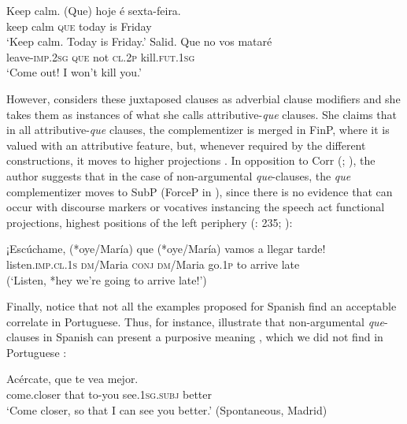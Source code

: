 \documentclass[output=paper,colorlinks,citecolor=brown,
]{langscibook}
\begin{document}
\ea \label{ex:matos:keep-calm}
\settowidth{}
 \ea \label{ex:matos:keep-calm-a}
 \gll Keep calm. (Que) hoje é sexta-feira. \\
	  keep calm \textsc{que} today is Friday\\
 \glt ‘Keep calm. Today is Friday.’
 \ex \label{ex:matos:salid}
 \gll Salid. Que no vos mataré \\
	  leave-\textsc{imp}.\textsc{2sg} \textsc{que} not \textsc{cl}.\textsc{2p} kill.\textsc{fut}.\textsc{1sg}\\
 \glt ‘Come out! I won’t kill you.’
 \z
 \citep[148]{kocher_unselected_2019}
\z 

However, \citet{kocher_unselected_2019} considers these juxtaposed clauses as adverbial clause modifiers and she takes them as instances of what she calls attributive-\textit{que} clauses. She claims that in all attributive-\textit{que} clauses, the complementizer is merged in FinP, where it is valued with an attributive feature, but, whenever required by the different constructions, it moves to higher projections \citep[161]{kocher_unselected_2019}. In opposition to Corr (\citeyear{corr_ibero-romance_2016}; \citeyear{corr_matrix_2018}), the author suggests that in the case of non-argumental \textit{que}-clauses, the \textit{que} complementizer moves to SubP (ForceP in \citealt{rizzi_fine_1997}), since there is no evidence that can occur with discourse markers or vocatives instancing the speech act functional projections,  highest positions of the left periphery (\citealt[235]{corr_ibero-romance_2016}: 235; \citealt[74]{kocher_unselected_2019}): 

\ea \label{ex:matos:escuchame}
\gll ¡Escúchame, (*oye/María) que (*oye/María) vamos a llegar tarde!\\
	 listen.\textsc{imp}.\textsc{cl}.\textsc{1s} \textsc{dm}/Maria \textsc{conj} \textsc{dm}/Maria go.\textsc{1p} to arrive late\\
\glt (‘Listen, *hey we’re going to arrive late!’)
\z 

Finally, notice that not all the examples proposed for Spanish find an acceptable correlate in Portuguese. Thus, for instance, \citet[223]{demonte_evidentiality_2014} illustrate that non-argumental \textit{que}-clauses in Spanish can present a purposive meaning , which we did not find in Portuguese :

\ea \label{ex:matos:acercate}
\gll Acércate, que te vea mejor.\\
     come.closer that to-you see.\textsc{1sg}.\textsc{subj} better\\ 
\glt ‘Come closer, so that I can see you better.’ (Spontaneous, Madrid)
\z 
\end{document}
